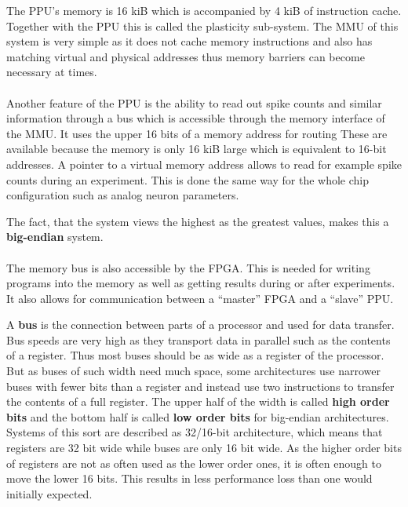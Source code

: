 The \ac{PPU}'s memory is 16 kiB which is accompanied by 4 kiB of instruction cache.
Together with the \ac{PPU} this is called the plasticity sub-system.
The \ac{MMU} of this system is very simple as it does not cache memory instructions and also has matching virtual and physical addresses thus memory barriers can become necessary at times.
\\
\\
Another feature of the \ac{PPU} is the ability to read out spike counts and similar information through a bus which is accessible through the memory interface of the \ac{MMU}.
It uses the upper 16 bits of a memory address for routing
These are available because the memory is only 16 kiB large which is equivalent to 16-bit addresses.
A pointer to a virtual memory address allows to read for example spike counts during an experiment.
This is done the same way for the whole chip configuration such as analog neuron parameters.

The fact, that the system views the highest as the greatest values, makes this a \textbf{big-endian} system.
\\
\\
The memory bus is also accessible by the \ac{FPGA}.
This is needed for writing programs into the memory as well as getting results during or after experiments.
It also allows for communication between a ``master'' \ac{FPGA} and a ``slave'' \ac{PPU}.

A \textbf{bus} is the connection between parts of a processor and used for data transfer.
Bus speeds are very high as they transport data in parallel such as the contents of a register.
Thus most buses should be as wide as a register of the processor.
But as buses of such width need much space, some architectures use narrower buses with fewer bits than a register and instead use two instructions to transfer the contents of a full register.
The upper half of the width is called \textbf{high order bits} and the bottom half is called \textbf{low order bits} for big-endian architectures.
Systems of this sort are described as 32/16-bit architecture, which means that registers are 32 bit wide while buses are only 16 bit wide.
As the higher order bits of registers are not as often used as the lower order ones, it is often enough to move the lower 16 bits.
This results in less performance loss than one would initially expected.

